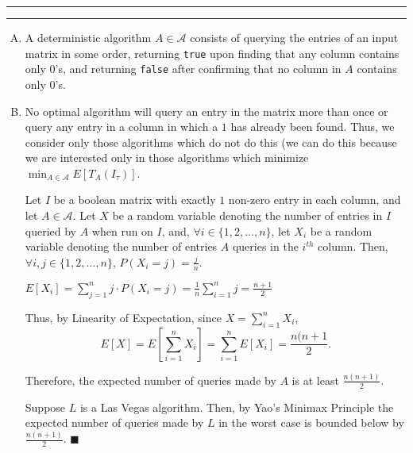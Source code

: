 \documentclass[11pt]{article}
\newcounter{questionCounter}
\newcounter{partCounter}[questionCounter]
\newenvironment{question}[2][\arabic{questionCounter}]{%
    \setcounter{partCounter}{0}%
    \vspace{.25in} \hrule \vspace{0.5em}%
        \noindent{\bf #2}%
    \vspace{0.8em} \hrule \vspace{.10in}%
    \addtocounter{questionCounter}{1}%
}{}
\begin{document}
\begin{question}{Problem 7: Shooting blanks}
\begin{enumerate}[A.]
\item A deterministic algorithm $A \in \mathcal{A}$ consists of querying the
entries of an input matrix in some order, returning \texttt{true} upon finding
that any column contains only $0$'s, and returning \texttt{false} after
confirming that no column in $A$ contains only $0$'s.

\item No optimal algorithm will query an entry in the matrix more than once or
query any entry in a column in which a $1$ has already been found. Thus, we
consider only those algorithms which do not do this (we can do this because we
are interested only in those algorithms which minimize
$\min_{A \in \mathcal{A}} E[T_A(I_{\tau})]$.

Let $I$ be a boolean matrix with exactly $1$ non-zero entry in each column,
and let $A \in \mathcal{A}$. Let $X$ be a random variable denoting the number
of entries in $I$ queried by $A$ when run on $I$, and,
$\forall i \in \{1,2,\ldots,n\}$, let $X_i$ be a random variable
denoting the number of entries $A$ queries in the $i^{th}$ column. Then,
$\forall i,j \in \{1,2,\ldots,n\}$, $P(X_i = j) = \frac{j}{n}$.

$E[X_i] = \sum_{j = 1}^n j\cdot P(X_i = j) = \frac{1}{n}\sum_{i = 1}^n j
 = \frac{n + 1}{2} $

Thus, by Linearity of Expectation, since $X = \sum_{i = 1}^n X_i$,
\[E[X] = E\left[\sum_{i = 1}^n X_i\right] = \sum_{i = 1}^n E[X_i]
= \frac{n(n + 1}{2}.\]

Therefore, the expected number of queries made by $A$ is at least
$\frac{n(n + 1)}{2}$.

Suppose $L$ is a Las Vegas algorithm. Then, by Yao's Minimax Principle the
expected number of queries made by $L$ in the worst case is bounded below by
$\frac{n(n + 1)}{2}$. \qquad $\blacksquare$

\end{enumerate}
\end{question}
\end{document}
